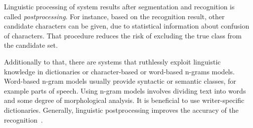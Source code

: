 Linguistic processing of system results after segmentation and recognition
is called \emph{postprocessing}. For instance, based on the recognition result,
other candidate characters can be given, due to statistical information about 
confusion of characters. That procedure reduces the risk of excluding the
true class from the candidate set.

Additionally to that, there are systems that ruthlessly exploit linguistic 
knowledge in dictionaries or character-based or word-based n-grams 
models. Word-based n-gram models usually provide syntactic or semantic classes, 
for example parts of speech. Using n-gram models involves dividing text into 
words and some degree of morphological analysis. It is beneficial to use 
writer-specific dictionaries. Generally, linguistic postprocessing improves
the accuracy of the recognition~.

